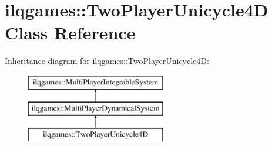 \hypertarget{classilqgames_1_1_two_player_unicycle4_d}{}\section{ilqgames\+:\+:Two\+Player\+Unicycle4D Class Reference}
\label{classilqgames_1_1_two_player_unicycle4_d}
Inheritance diagram for ilqgames\+:\+:Two\+Player\+Unicycle4D\+:\begin{figure}[H]
\begin{center}
\leavevmode
\includegraphics[height=3.000000cm]{classilqgames_1_1_two_player_unicycle4_d}
\end{center}
\end{figure}
